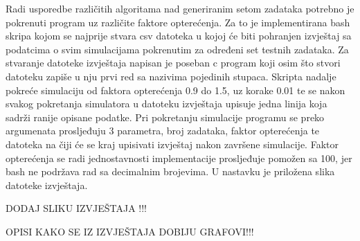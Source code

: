 \documentclass[../zavrsni.tex]{subfiles}
\begin{document}
Radi usporedbe različitih algoritama nad generiranim setom zadataka potrebno je pokrenuti program uz različite faktore opterećenja. 
Za to je implementirana bash skripa kojom se najprije stvara csv datoteka u kojoj će biti pohranjen izvještaj sa podatcima o 
svim simulacijama pokrenutim za određeni set testnih zadataka. Za stvaranje datoteke izvještaja napisan je poseban c program koji osim što
stvori datoteku zapiše u nju prvi red sa nazivima pojedinih stupaca.
Skripta nadalje pokreće simulaciju od faktora opterećenja 0.9 do 1.5, uz korake 0.01 te se nakon svakog pokretanja simulatora u 
datoteku izvještaja upisuje jedna linija koja sadrži ranije opisane podatke.
Pri pokretanju simulacije programu se preko argumenata prosljeđuju 3 parametra, broj zadataka, 
faktor opterećenja te datoteka na čiji će se kraj upisivati izvještaj nakon završene simulacije.
Faktor opterećenja se radi jednostavnosti implementacije prosljeđuje pomožen sa 100, jer bash ne podržava rad sa decimalnim brojevima.
U nastavku je priložena slika datoteke izvještaja.

DODAJ SLIKU IZVJEŠTAJA !!!

OPISI KAKO SE IZ IZVJEŠTAJA DOBIJU GRAFOVI!!!
\end{document}
